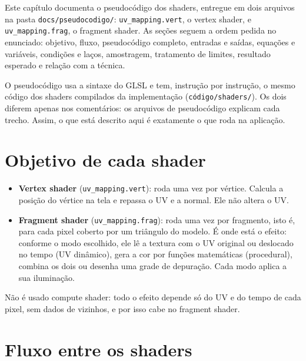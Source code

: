 
Este capítulo documenta o pseudocódigo dos shaders, entregue em dois arquivos na pasta \texttt{docs/pseudocodigo/}: \texttt{uv\_mapping.vert}, o vertex shader, e \texttt{uv\_mapping.frag}, o fragment shader. As seções seguem a ordem pedida no enunciado: objetivo, fluxo, pseudocódigo completo, entradas e saídas, equações e variáveis, condições e laços, amostragem, tratamento de limites, resultado esperado e relação com a técnica.

O pseudocódigo usa a sintaxe do GLSL e tem, instrução por instrução, o mesmo código dos shaders compilados da implementação (\texttt{código/shaders/}). Os dois diferem apenas nos comentários: os arquivos de pseudocódigo explicam cada trecho. Assim, o que está descrito aqui é exatamente o que roda na aplicação.

\section{Objetivo de cada shader}

\begin{itemize}
    \item \textbf{Vertex shader} (\texttt{uv\_mapping.vert}): roda uma vez por vértice. Calcula a posição do vértice na tela e repassa o UV e a normal. Ele não altera o UV.
    \item \textbf{Fragment shader} (\texttt{uv\_mapping.frag}): roda uma vez por fragmento, isto é, para cada pixel coberto por um triângulo do modelo. É onde está o efeito: conforme o modo escolhido, ele lê a textura com o UV original ou deslocado no tempo (UV dinâmico), gera a cor por funções matemáticas (procedural), combina os dois ou desenha uma grade de depuração. Cada modo aplica a sua iluminação.
\end{itemize}

Não é usado compute shader: todo o efeito depende só do UV e do tempo de cada pixel, sem dados de vizinhos, e por isso cabe no fragment shader.

\section{Fluxo entre os shaders}

